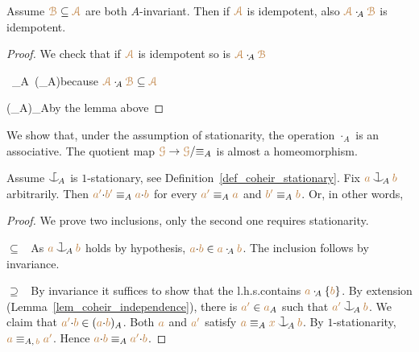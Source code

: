 \documentclass[creche.tex]{subfiles}
\begin{document}
\begin{corollary}\label{corol_min_idempotent}
Assume ${\color{brown}\EuScript B}\subseteq{\color{brown}{\EuScript A}}$ are both $A$-invariant.
Then if ${\color{brown}{\EuScript A}}$ is idempotent,
also ${\color{brown}{\EuScript A}}\cdot_{\!A}{\color{brown}\EuScript B}$ is idempotent.
\end{corollary}
\begin{proof}
We check that if ${\color{brown}{\EuScript A}}$ is idempotent so is ${\color{brown}{\EuScript A}}\cdot_{\!A}{\color{brown}\EuScript B}$

    {\subseteq}
    {\mrA\ \cdot_{\!A}\ \big(\mrA\cdot_{\!A}\mrB\big)}\hfill because ${\color{brown}{\EuScript A}}\cdot_{\!A}{\color{brown}\EuScript B}\subseteq{\color{brown}{\EuScript A}}$

\ceq{}
    {\subseteq}
    {\big(\mrA\cdot_{\!A}\mrA\big)\cdot_{\!A}\mrB}\hfill by the lemma above

\end{proof}

We show that, under the assumption of stationarity,
the operation $\cdot_{\!A}$ is an associative.
The quotient map ${\color{brown}\EuScript G}\to{\color{brown}\EuScript G}/{\equiv_A}$ is almost a homeomorphism.


\begin{proposition}\label{prop_orbits_main}
Assume $\nonforkc_{\!A}$ is $1$-stationary,
see Definition~\ref{def_coheir_stationary}.
Fix ${\mr a}\cnonfork_{\!A}{\mr b}$ arbitrarily.
Then ${\color{brown} a'}{\cdot}{\color{brown} b'}\equiv_A{\color{brown} a}{\cdot}{\color{brown} b}$ for every ${\color{brown} a'}\equiv_A{\color{brown} a}$ and  ${\color{brown} b'}\equiv_A{\color{brown} b}$.
Or, in other words,

\end{proposition}
\begin{proof} 
We prove two inclusions,
only the second one requires stationarity.

$\subseteq$ \ As ${\mr a}\cnonfork_{\!A}{\mr b}$ holds by hypothesis,
${\color{brown} a}{\cdot}{\color{brown} b}\in{\color{brown}a}\cdot_{\!A}{\color{brown} b}$.
The inclusion follows by invariance.

$\supseteq$ \ By invariance it suffices to show that 
the l.h.s.\@ contains ${\color{brown} a}\cdot_{\!A}\{{\color{brown} b}\}$.
By extension (Lemma~\ref{lem_coheir_independence}), there is ${\color{brown} a'}\in{\color{brown}a}_A$ such that ${\mr a'}\cnonfork_{\!A}{\mr b}$.
We claim that ${\color{brown} a'}{\cdot}{\color{brown} b}\in({\color{brown} a}{\cdot}{\color{brown} b})_A$.
Both ${\color{brown} a}$ and ${\color{brown} a'}$ satisfy ${\mr a}\equiv_A{\mr x}\cnonfork_{\!A}{\mr b}$.
By $1$-stationarity,
${\color{brown} a}\equiv_{A,\,{\color{brown} b}}{\color{brown} a'}$.
Hence ${\color{brown} a}{\cdot}{\color{brown} b}\equiv_A{\color{brown} a'}{\cdot}{\color{brown} b}$.
\end{proof}
\end{document}
